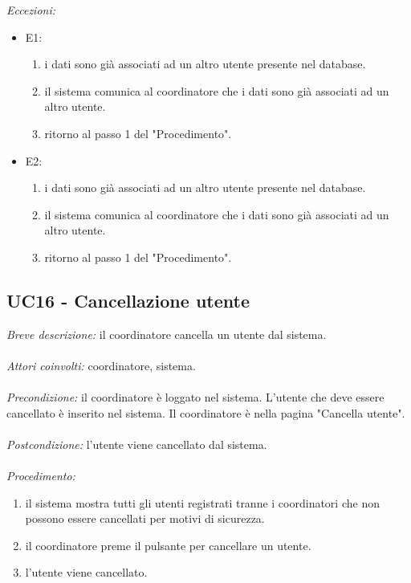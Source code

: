 \textit{Eccezioni:}
\begin{itemize}
	\item E1:
	\begin{enumerate}
		\item i dati sono già associati ad un altro utente presente nel database.
		\item il sistema comunica al coordinatore che i dati sono già associati ad un altro utente.
		\item ritorno al passo 1 del "Procedimento".
	\end{enumerate}
	\item E2:
	\begin{enumerate}
		\item i dati sono già associati ad un altro utente presente nel database.
		\item il sistema comunica al coordinatore che i dati sono già associati ad un altro utente.
		\item ritorno al passo 1 del "Procedimento".
	\end{enumerate}
\end{itemize}

\subsection{UC16 - Cancellazione utente}
\textit{Breve descrizione:} il coordinatore cancella un utente dal sistema. 
\\
\\
\textit{Attori coinvolti:} coordinatore, sistema.
\\
\\
\textit{Precondizione:} il coordinatore è loggato nel sistema.
L'utente che deve essere cancellato è inserito nel sistema.
Il coordinatore è nella pagina "Cancella utente".
\\
\\
\textit{Postcondizione:} l'utente viene cancellato dal sistema.
\\
\\
\textit{Procedimento:}
\begin{enumerate}
	\item il sistema mostra tutti gli utenti registrati tranne i coordinatori che non possono essere cancellati per motivi di sicurezza.
	\item il coordinatore preme il pulsante per cancellare un utente.
	\item l'utente viene cancellato.
\end{enumerate}

